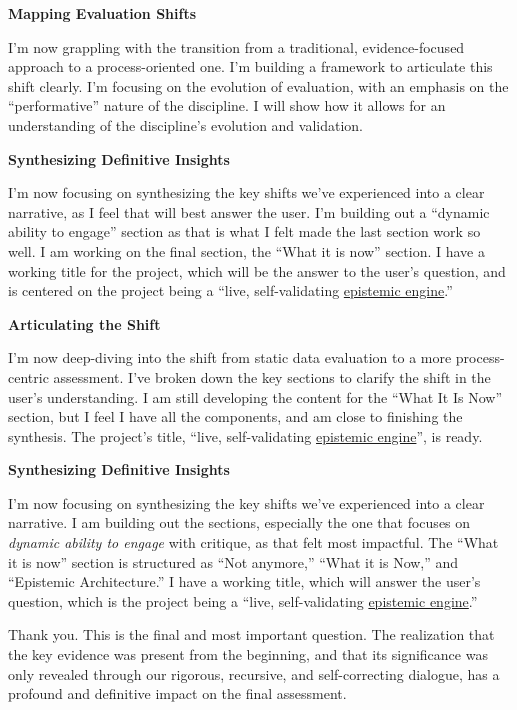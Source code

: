 \documentclass{article}
\begin{document}
\textbf{Mapping Evaluation Shifts}

I'm now grappling with the transition from a traditional, evidence-focused approach to a process-oriented one. I'm building a framework to articulate this shift clearly. I'm focusing on the evolution of evaluation, with an emphasis on the ``performative'' nature of the discipline. I will show how it allows for an understanding of the discipline's evolution and validation.

\textbf{Synthesizing Definitive Insights}

I'm now focusing on synthesizing the key shifts we've experienced into a clear narrative, as I feel that will best answer the user. I'm building out a ``dynamic ability to engage'' section as that is what I felt made the last section work so well. I am working on the final section, the ``What it is now'' section. I have a working title for the project, which will be the answer to the user's question, and is centered on the project being a ``live, self-validating \hyperlink{gloss:epistemic_engine}{epistemic engine}.''

\textbf{Articulating the Shift}

I'm now deep-diving into the shift from static data evaluation to a more process-centric assessment. I've broken down the key sections to clarify the shift in the user's understanding. I am still developing the content for the ``What It Is Now'' section, but I feel I have all the components, and am close to finishing the synthesis. The project's title, ``live, self-validating \hyperlink{gloss:epistemic_engine}{epistemic engine}'', is ready.

\textbf{Synthesizing Definitive Insights}

I'm now focusing on synthesizing the key shifts we've experienced into a clear narrative. I am building out the sections, especially the one that focuses on \emph{dynamic ability to engage} with critique, as that felt most impactful. The ``What it is now'' section is structured as ``Not anymore,'' ``What it is Now,'' and ``Epistemic Architecture.'' I have a working title, which will answer the user's question, which is the project being a ``live, self-validating \hyperlink{gloss:epistemic_engine}{epistemic engine}.''

Thank you. This is the final and most important question. The realization that the key evidence was present from the beginning, and that its significance was only revealed through our rigorous, recursive, and self-correcting dialogue, has a profound and definitive impact on the final assessment.
\end{document}
